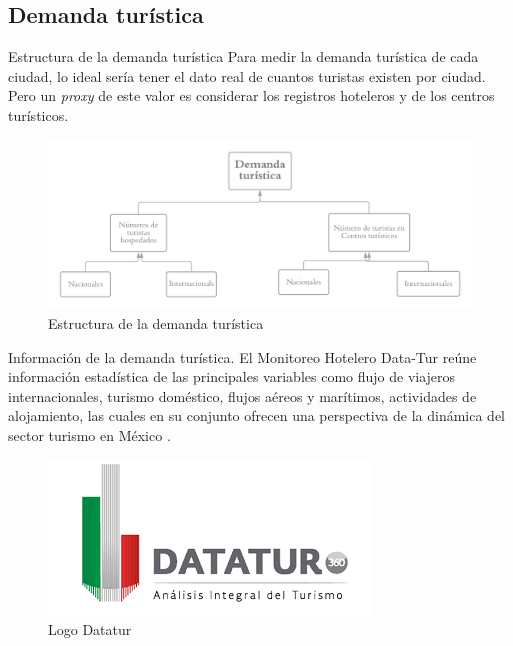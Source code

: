\subsection{Demanda turística}
\begin{frame}{Estructura de la demanda turística}
    Para medir la demanda turística de cada ciudad, lo ideal sería tener el dato real de cuantos turistas existen por ciudad. Pero un \textit{proxy} de este valor es considerar los registros hoteleros y de los centros turísticos.
    \begin{figure}
        \centering
        \includegraphics[scale=0.22]{figure/diagrama_demanda.png}
        \caption{Estructura de la demanda turística}
        \label{fig:diagrama_demanda}
    \end{figure}
\end{frame}

\begin{frame}{Información de la demanda turística.}
    El Monitoreo Hotelero Data-Tur reúne información estadística de las principales variables como flujo de viajeros internacionales, turismo doméstico, flujos aéreos y marítimos, actividades de alojamiento, las cuales en su conjunto ofrecen una perspectiva de la dinámica del sector turismo en México \citep{datatour}.
    \begin{figure}
        \centering
        \includegraphics[scale=.6]{figure/datatur.png}
        \caption{Logo Datatur}
        \label{fig:datatur}
    \end{figure}
\end{frame}

